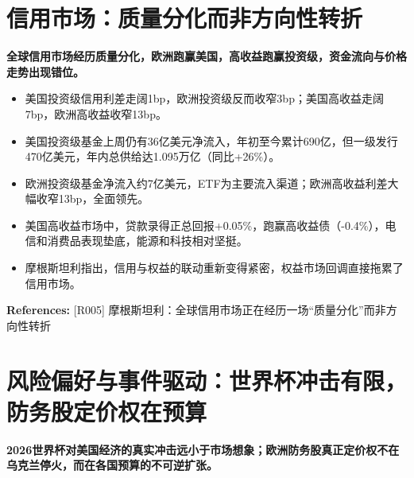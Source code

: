 \documentclass[11pt]{ctexart}
\begin{document}
\section{信用市场：质量分化而非方向性转折}
\textbf{全球信用市场经历质量分化，欧洲跑赢美国，高收益跑赢投资级，资金流向与价格走势出现错位。}

\begin{itemize}
  \item 美国投资级信用利差走阔1bp，欧洲投资级反而收窄3bp；美国高收益走阔7bp，欧洲高收益收窄13bp。
  \item 美国投资级基金上周仍有36亿美元净流入，年初至今累计690亿，但一级发行470亿美元，年内总供给达1.095万亿（同比+26\%）。
  \item 欧洲投资级基金净流入约7亿美元，ETF为主要流入渠道；欧洲高收益利差大幅收窄13bp，全面领先。
  \item 美国高收益市场中，贷款录得正总回报+0.05\%，跑赢高收益债（-0.4\%），电信和消费品表现垫底，能源和科技相对坚挺。
  \item 摩根斯坦利指出，信用与权益的联动重新变得紧密，权益市场回调直接拖累了信用市场。
\end{itemize}
{\small\color{refgray}\textbf{References:} [R005] 摩根斯坦利：全球信用市场正在经历一场“质量分化”而非方向性转折}

\section{风险偏好与事件驱动：世界杯冲击有限，防务股定价权在预算}
\textbf{2026世界杯对美国经济的真实冲击远小于市场想象；欧洲防务股真正定价权不在乌克兰停火，而在各国预算的不可逆扩张。}
\end{document}
